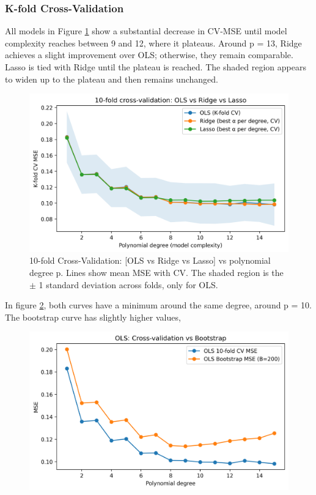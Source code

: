 \documentclass[amssymb,twocolumn,aps]{revtex4-2}
\begin{document}
\subsubsection{K-fold Cross-Validation}

All models in Figure \ref{fig:10_fold_CV} show a substantial decrease in CV-MSE until model complexity reaches between 9 and 12, where it plateaus. Around p = 13, Ridge achieves a slight improvement over OLS; otherwise, they remain comparable. Lasso is tied with Ridge until the plateau is reached. The shaded region appears to widen up to the plateau and then remains unchanged. 

\begin{figure}[H]
    \centering
    \includegraphics[width=1\linewidth]{Project-1/Figures/cv_mse.png}
    \caption{10-fold Cross-Validation: [OLS vs Ridge vs Lasso] vs polynomial degree p. Lines show mean MSE with CV. The shaded region is the $\pm$ 1 standard deviation across folds, only for OLS.}
    \label{fig:10_fold_CV}
\end{figure}

In figure \ref{fig:CV_vs_bootstrap}, both curves have a minimum around the same degree, around p = 10. The bootstrap curve has slightly higher values,  

\begin{figure}[H]
    \centering
    \includegraphics[width=1\linewidth]{Project-1/Figures/OLS_cv_vs_bootstrap.png}
    \caption{}
    \label{fig:CV_vs_bootstrap}
\end{figure}
\end{document}
